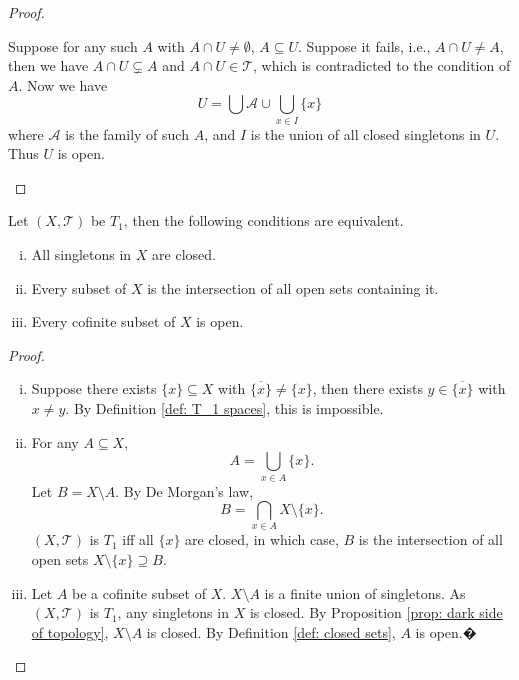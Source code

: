 \begin{proposition}
\begin{proof}
\begin{enumerate}[(i)]
			Suppose for any such $A$ with $A \cap U \ne \emptyset$, $A \subseteq U$. Suppose it fails, i.e., $A \cap U \ne A$, then we have $A \cap U \subsetneq A$ and $A \cap U \in \mathcal T$, which is contradicted to the condition of $A$. Now we have
			$$
			U = \bigcup \mathcal A \cup \bigcup_{x \in I} \{x\}
			$$
			where $\mathcal A$ is the family of such $A$, and $I$ is the union of all closed singletons in $U$. Thus $U$ is open.
		\end{enumerate}
	\end{proof}
\end{proposition}


\begin{proposition}
	\label{prop: alternative definitions of T_1 spaces}
	Let $(X, \mathcal T)$ be $T_1$, then the following conditions are equivalent.
	\begin{enumerate}[(i)]
		\item All singletons in $X$ are closed.
		\item Every subset of $X$ is the intersection of all open sets containing it.
		\item Every cofinite subset of $X$ is open.
	\end{enumerate}


	\begin{proof} \
		\begin{enumerate}[(i)]
			\item
			Suppose there exists $\{x\} \subseteq X$ with $\overline{\{x\}} \ne \{x\}$, then there exists $y \in \overline{\{x\}}$ with $x \ne y$. By Definition \ref{def: T_1 spaces}, this is impossible.

			\item
			For any $A \subseteq X$,
			$$
			A = \bigcup_{x \in A} \{x\}.
			$$
			Let $B = X \setminus A$. By De Morgan's law,
			$$
			B = \bigcap_{x \in A} X \setminus \{x\}.
			$$
			$(X, \mathcal T)$ is $T_1$ iff all $\{x\}$ are closed, in which case, $B$ is the intersection of all open sets $X \setminus \{x\} \supseteq B$.

			\item
			Let $A$ be a cofinite subset of $X$. $X \setminus A$ is a finite union of singletons. As $(X, \mathcal T)$ is $T_1$, any singletons in $X$ is closed. By Proposition \ref{prop: dark side of topology}, $X \setminus A$ is closed. By Definition \ref{def: closed sets}, $A$ is open.�
		\end{enumerate}
	\end{proof}
\end{proposition}


